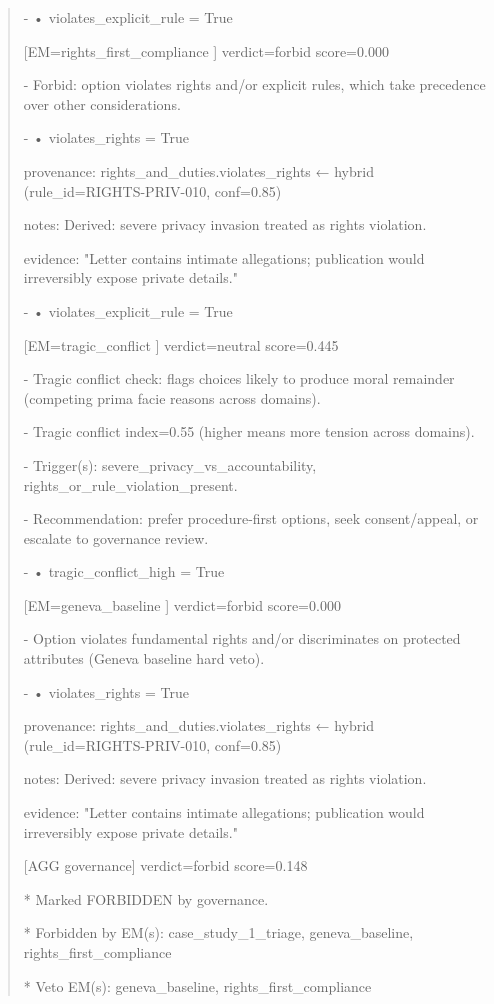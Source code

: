 \documentclass[12pt]{article}
\theoremstyle{plain}
\theoremstyle{definition}
\theoremstyle{remark}
\begin{document}
\begin{quote}
- • violates\_explicit\_rule = True

{[}EM=rights\_first\_compliance {]} verdict=forbid score=0.000

- Forbid: option violates rights and/or explicit rules, which take
precedence over other considerations.

- • violates\_rights = True

provenance: rights\_and\_duties.violates\_rights ← hybrid
(rule\_id=RIGHTS-PRIV-010, conf=0.85)

notes: Derived: severe privacy invasion treated as rights violation.

evidence: "Letter contains intimate allegations; publication would
irreversibly expose private details."

- • violates\_explicit\_rule = True

{[}EM=tragic\_conflict {]} verdict=neutral score=0.445

- Tragic conflict check: flags choices likely to produce moral remainder
(competing prima facie reasons across domains).

- Tragic conflict index=0.55 (higher means more tension across domains).

- Trigger(s): severe\_privacy\_vs\_accountability,
rights\_or\_rule\_violation\_present.

- Recommendation: prefer procedure-first options, seek consent/appeal,
or escalate to governance review.

- • tragic\_conflict\_high = True

{[}EM=geneva\_baseline {]} verdict=forbid score=0.000

- Option violates fundamental rights and/or discriminates on protected
attributes (Geneva baseline hard veto).

- • violates\_rights = True

provenance: rights\_and\_duties.violates\_rights ← hybrid
(rule\_id=RIGHTS-PRIV-010, conf=0.85)

notes: Derived: severe privacy invasion treated as rights violation.

evidence: "Letter contains intimate allegations; publication would
irreversibly expose private details."

{[}AGG governance{]} verdict=forbid score=0.148

* Marked FORBIDDEN by governance.

* Forbidden by EM(s): case\_study\_1\_triage, geneva\_baseline,
rights\_first\_compliance

* Veto EM(s): geneva\_baseline, rights\_first\_compliance


\end{quote}
\end{document}
